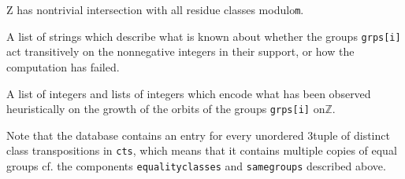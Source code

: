\documentclass[a4paper,11pt]{report}
\begin{document}
{{{\begin{description}
{{Z}} has nontrivial intersection with all residue classes modulo{\nobreakspace}\texttt{m}. 
\item[{\texttt{trsstatus}}]  A list of strings which describe what is known about whether the groups \texttt{grps[i]} act transitively on the nonnegative integers in their support, or how the
computation has failed. 
\item[{\texttt{orbitgrowthtype}}]  A list of integers and lists of integers which encode what has been observed
heuristically on the growth of the orbits of the groups \texttt{grps[i]} on{\nobreakspace}{\ensuremath{\mathbb Z}}. 
\end{description}
 Note that the database contains an entry for every unordered
3\texttt{}tuple of distinct class transpositions in \texttt{cts}, which means that it contains multiple copies of equal groups
\texttt{}\texttt{} cf. the components \texttt{equalityclasses} and \texttt{samegroups} described above. 

}}}
\end{document}
